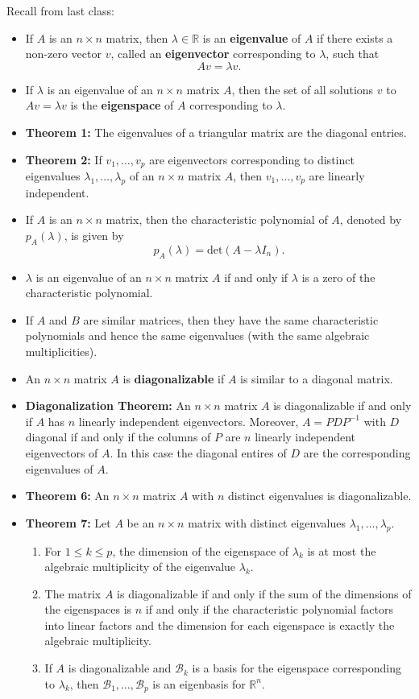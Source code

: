\documentclass[12pt,letterpaper]{article}
\begin{document}
\thispagestyle{fancy}

Recall from last class:

\begin{itemize}
\item If $A$ is an $n \times n$ matrix, then $\lambda \in \mathbb{R}$ is an {\bf eigenvalue} of $A$ if there exists a non-zero vector $v$, called an {\bf eigenvector} corresponding to $\lambda$, such that $$Av=\lambda v.$$
\item If $\lambda$ is an eigenvalue of an $n \times n$ matrix $A$, then the set of all solutions $v$ to $Av = \lambda v$ is the {\bf eigenspace} of $A$ corresponding to $\lambda$.
\item {\bf Theorem 1:} The eigenvalues of a triangular matrix are the diagonal entries.
\item {\bf Theorem 2:} If $v_1, \dots, v_p$ are eigenvectors corresponding to distinct eigenvalues $\lambda_1, \dots, \lambda_p$ of an $n\times n$ matrix $A$, then $v_1, \dots, v_p$ are linearly independent.
\item If $A$ is an $n\times n$ matrix, then the characteristic polynomial of $A$, denoted by $p_A(\lambda)$, is given by $$p_A(\lambda)=\text{det}(A-\lambda I_n).$$
\item $\lambda$ is an eigenvalue of an $n\times n$ matrix $A$ if and only if $\lambda$ is a zero of the characteristic polynomial.
\item If $A$ and $B$ are similar matrices, then they have the same characteristic polynomials and hence the same eigenvalues (with the same algebraic multiplicities). 
\item An $n\times n$ matrix $A$ is {\bf diagonalizable} if $A$ is similar to a diagonal matrix.
\item {\bf Diagonalization Theorem:} An $n \times n$ matrix $A$ is diagonalizable if and only if $A$ has $n$ linearly independent eigenvectors. Moreover, $A=PDP^{-1}$ with $D$ diagonal if and only if the columns of $P$ are $n$ linearly independent eigenvectors of $A$. In this case the diagonal entires of $D$ are the corresponding eigenvalues of $A$.
\item {\bf Theorem 6:} An $n \times n$ matrix $A$ with $n$ distinct eigenvalues is diagonalizable.
\item 
{\bf Theorem 7:} Let $A$ be an $n\times n$ matrix with distinct eigenvalues $\lambda_1, \dots, \lambda_p$.
\begin{enumerate}
\item For $1\leq k \leq p$, the dimension of the eigenspace of $\lambda_k$ is at most the algebraic multiplicity of the eigenvalue $\lambda_k$.
\item The matrix $A$ is diagonalizable if and only if the sum of the dimensions of the eigenspaces is $n$ if and only if the characteristic polynomial factors into linear factors and the dimension for each eigenspace is exactly the algebraic multiplicity.
\item If $A$ is diagonalizable and $\mathcal{B}_k$ is a basis for the eigenspace corresponding to $\lambda_k$, then $\mathcal{B}_1, \dots, \mathcal{B}_p$ is an eigenbasis for $\mathbb{R}^n$.
\end{enumerate}
\end{itemize}
\end{document}
